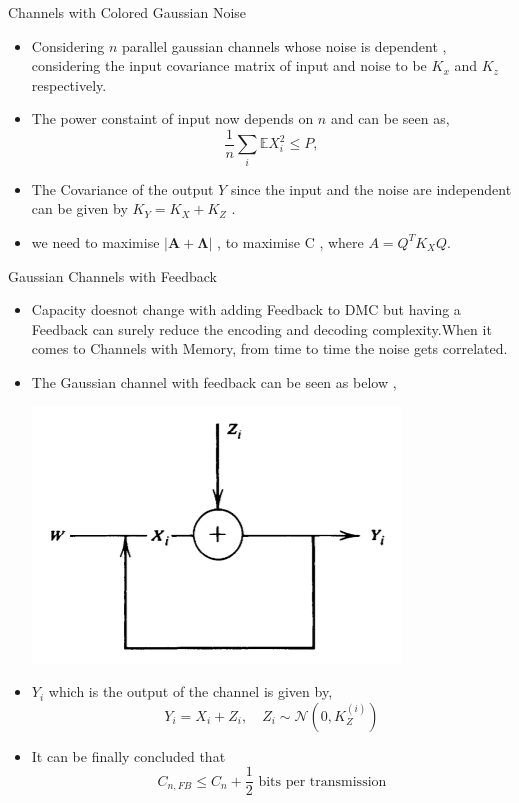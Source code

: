 \documentclass{beamer}
\begin{document}
\begin{frame}{Channels with Colored Gaussian Noise}
 \begin{itemize}
	\justifying
\item Considering $n$ parallel gaussian channels whose noise is dependent , considering the input covariance matrix of input and noise to be $K_x$ and $K_z$ respectively. 
\item The power constaint of input now depends on $n$ and can be seen as,
\begin{equation}
\frac{1}{n} \sum_i \mathbb{E}X_i^2 \leq P,
\end{equation}
\item The Covariance of the output \( Y \) since the input and the noise are independent can be given by \( K_Y = K_X + K_Z \) .
\item we need to maximise \( |\mathbf{A} + \mathbf{\Lambda}| \) , to maximise C , where \( A = Q^T K_X Q \).


	\end{itemize}
\end{frame}

\begin{frame}{Gaussian Channels with Feedback}
 \begin{itemize}
	\justifying
\item Capacity doesnot change with adding Feedback to DMC but having a Feedback can surely reduce the encoding and decoding complexity.When it comes to Channels with Memory, from time to time the noise gets correlated.
\item The Gaussian channel with feedback can be seen as below ,
\begin{center}
	\includegraphics[scale=0.2]{Diagrams/Gaussian_Channel_with_FeedBack.png}
\end{center} 
\item  $Y_i$ which is the output of the channel is given by,
\begin{equation}
Y_i = X_i + Z_i, \quad Z_i \sim \mathcal{N}(0, K_Z^{(i)})
\end{equation}
\item It can be finally concluded that 
\begin{equation}
C_{n,FB} \leq C_n + \frac{1}{2} \text{ bits per transmission} 
\end{equation}


	\end{itemize}
\end{frame}
\end{document}
